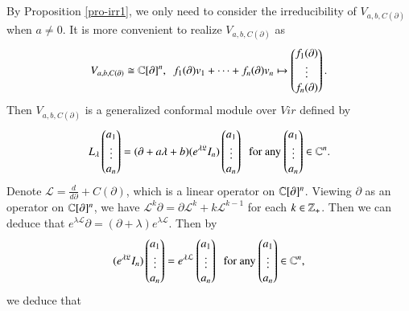 \documentclass[12pt]{amsart}
\begin{document}
By Proposition \ref{pro-irr1}, we only need to consider the irreducibility of $V_{a,b,C(\partial)}$ when $a\neq 0$.
It is more convenient to realize $V_{a,b,C(\partial)}$ as
$$V_{a,b,C(\partial)}\cong \mathbb{C}[\partial]^n,\ \ f_1(\partial)v_1+\cdots+f_n(\partial)v_n\mapsto \begin{pmatrix}f_1(\partial)\\
\vdots\\
f_n(\partial)
\end{pmatrix}.$$
Then $V_{a,b,C(\partial)}$ is a generalized conformal module over $Vir$ defined by
\begin{eqnarray*}
L_\lambda \begin{pmatrix}a_1\\
\vdots\\
a_n
\end{pmatrix}=(\partial+a \lambda+b)(e^{\lambda\mathfrak{L}}I_n)
\begin{pmatrix}a_1\\
\vdots\\
a_n
\end{pmatrix}\;\; \text{for any $\begin{pmatrix}a_1\\
\vdots\\
a_n
\end{pmatrix}\in\mathbb{C}^n$}.
\end{eqnarray*}
Denote $\mathcal{L}=\frac{d}{d\partial}+C(\partial)$, which is a linear operator on $\mathbb{C}[\partial]^{n}$. Viewing $\partial$ as an operator on $\mathbb{C}[\partial]^{n}$, we have
$\mathcal{L}^k\partial=\partial \mathcal{L}^k+k\mathcal{L}^{k-1}$ for each $k\in\mathbb{Z}_+$.
Then we can deduce that $e^{\lambda \mathcal{L}}\partial=(\partial+\lambda)e^{\lambda \mathcal{L}}$. Then by
$$(e^{\lambda\mathfrak{L}}I_n)
\begin{pmatrix}a_1\\
\vdots\\
a_n
\end{pmatrix}=e^{\lambda\mathcal{L}}
\begin{pmatrix}a_1\\
\vdots\\
a_n
\end{pmatrix}\;\; \text{for any $\begin{pmatrix}a_1\\
\vdots\\
a_n
\end{pmatrix}\in\mathbb{C}^n$,}
$$
we deduce that
\end{document}

